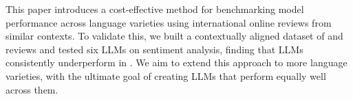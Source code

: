 
This paper introduces a cost-effective method for benchmarking model performance across language varieties using international online reviews from similar contexts.
To validate this, we built a contextually aligned dataset of \twChinese and \cnChinese reviews and tested six LLMs on sentiment analysis, finding that LLMs consistently underperform in \twChinese. 
We aim to extend this approach to more language varieties, with the ultimate goal of creating LLMs that perform equally well across them.







